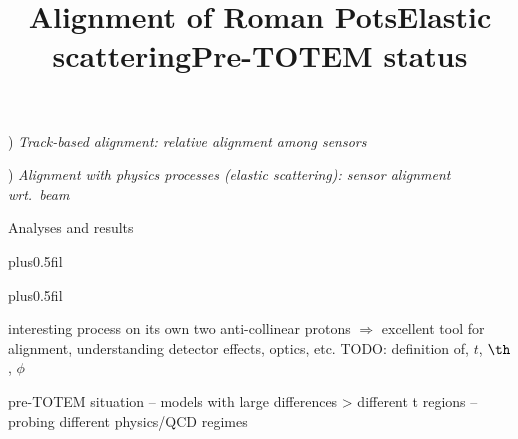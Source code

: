 
\newpage %
\title{Alignment of Roman Pots}


) \em{\cYe Track-based alignment\cFg}: relative alignment among sensors


\vfil
{}) \em{\cYe Alignment with physics processes (elastic scattering)\cFg}: sensor alignment wrt.~beam


\vfil

\newpage %
\hbox{}
\vfil

\vskip2mm
\centerline{\PartFont\cYe Analyses and results\cFg}

\vfil

\newpage %
\hbox{}
\vfil
\title{Elastic scattering}

\vskip0pt plus0.5fil

\vskip0pt plus0.5fil

\> interesting process on its own
\> two anti-collinear protons $\Rightarrow$ excellent tool for alignment, understanding detector effects, optics, etc.
\> TODO: definition of, $t$, $\th$, $\phi$

\newpage %
\title{Pre-TOTEM status}

\> pre-TOTEM situation -- models with large differences
\>> different t regions -- probing different physics/QCD regimes

